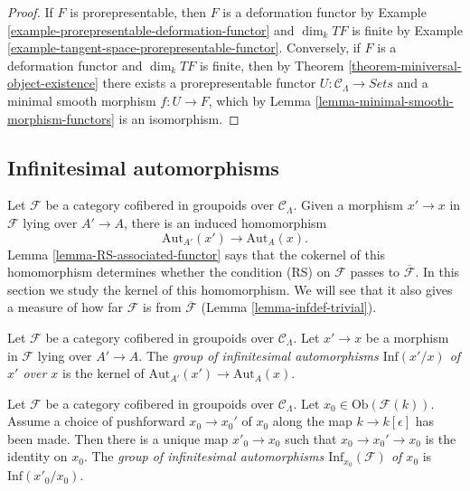 \begin{proof}
If $F$ is prorepresentable, then $F$ is a deformation functor by Example 
\ref{example-prorepresentable-deformation-functor} and $\dim_k TF$ is finite by 
Example \ref{example-tangent-space-prorepresentable-functor}.  Conversely, if 
$F$ is a deformation functor and $\dim_k TF$ is finite, then by Theorem 
\ref{theorem-miniversal-object-existence} there exists a prorepresentable 
functor $U: \mathcal{C}_\Lambda \to \textit{Sets}$ and a minimal 
smooth morphism $f: U \to F$, which by Lemma 
\ref{lemma-minimal-smooth-morphism-functors} is an isomorphism.
\end{proof}

\subsection{Infinitesimal automorphisms}
\label{subsection-infinitesimal-automorphisms}

\noindent
Let $\mathcal{F}$ be a category cofibered in groupoids over $\mathcal 
C_\Lambda$. Given a morphism $x' \to x$ in $\mathcal{F}$ lying over 
$A' \to A$, there is an induced homomorphism
\[ \text{Aut}_{A'}(x') \to \text{Aut}_{A}(x). \]
Lemma \ref{lemma-RS-associated-functor} says that the cokernel of this 
homomorphism determines whether the condition (RS) on $\mathcal{F}$ passes to 
$\overline{\mathcal{F}}$. In this section we study the kernel of this 
homomorphism. We will see that it also gives a measure of how far $\mathcal{F}$ 
is from $\overline{\mathcal{F}}$ (Lemma \ref{lemma-infdef-trivial}).  

\begin{definition}
\label{definition-relative-infinitesimal-auts}
Let $\mathcal{F}$ be a category cofibered in groupoids over $\mathcal 
C_\Lambda$. Let $x' \to x$ be a morphism in $\mathcal{F}$ lying over 
$A' \to A$. The {\it group of infinitesimal automorphisms 
$\text{Inf}({x'/x})$ of $x'$ over $x$} is the kernel of 
$\text{Aut}_{A'}(x') \to \text{Aut}_{A}(x)$.
\end{definition}

\begin{definition}
\label{definition-infinitesimal-auts}
Let $\mathcal{F}$ be a category cofibered in groupoids over $\mathcal 
C_\Lambda$. Let $x_0 \in \text{Ob}(\mathcal{F}(k))$. Assume a choice of 
pushforward $x_0 \to x_0'$ of $x_0$ along the map $k \to 
k[\epsilon]$ has been made.  Then there is a unique map $x'_0 \to 
x_0$ such that $x_0 \to x_0' \to x_0$ is the identity on $x_0$. 
The {\it group of infinitesimal automorphisms $\text{Inf}_{x_0}(\mathcal 
F)$ of $x_0$} is $\text{Inf}(x'_0/x_0)$.
\end{definition}

